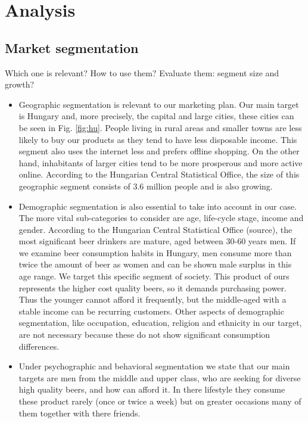 \newpage
\section{Analysis}
\subsection{Market segmentation}

Which one is relevant? How to use them? Evaluate them: segment size and growth?
\begin{itemize}
   \item Geographic segmentation is relevant to our marketing plan. Our main target is Hungary and, more precisely, the capital and large cities, these cities can be seen in Fig. \ref{fig:hu}. People living in rural areas and smaller towns are less likely to buy our products as they tend to have less disposable income. This segment also uses the internet less and prefers offline shopping. On the other hand, inhabitants of larger cities tend to be more prosperous and more active online. According to the Hungarian Central Statistical Office, the size of this geographic segment consists of 3.6 million people and is also growing. \cite{ksh1}

   \item Demographic segmentation is also essential to take into account in our case. The more vital sub-categories to consider are age, life-cycle stage, income and gender. According to the Hungarian Central Statistical Office (source), the most significant beer drinkers are mature, aged between 30-60 years men. \cite{ksh2} If we examine beer consumption habits in Hungary, men consume more than twice the amount of beer as women and can be shown male surplus in this age range. We target this specific segment of society. This product of ours represents the higher cost quality beers, so it demands purchasing power. Thus the younger cannot afford it frequently, but the middle-aged with a stable income can be recurring customers. Other aspects of demographic segmentation, like occupation, education, religion and ethnicity in our target, are not necessary because these do not show significant consumption differences.


   \item Under psychographic and behavioral segmentation we state that our main targets are men from the middle and upper class, who are seeking for diverse high quality beers, and how can afford it. In there lifestyle they consume these product rarely (once or twice a week) but on greater occasions many of them together with there friends.
\end{itemize}

